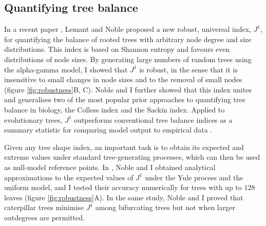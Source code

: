 \subsection{Quantifying tree balance}
In a recent paper \cite{lemant_robust_2022}, Lemant and Noble proposed a new
robust, universal index, $J^1$, for quantifying the balance of rooted trees
with arbitrary node degree and size distributions. This index is based on
Shannon entropy and favours even distributions of node sizes. By generating
large numbers of random trees using the alpha-gamma model, I showed that $J^1$
is robust, in the sense that it is insensitive to small changes in node sizes
and to the removal of small nodes (figure \ref{fig:robustness}B, C). Noble and
I further showed that this index unites and generalises two of the most popular
prior approaches to quantifying tree balance in biology, the Colless index and
the Sackin index. Applied to evolutionary trees, $J^1$ outperforms conventional
tree balance indices as a summary statistic for comparing model output to
empirical data \cite{noble_spatial_2022}.\par Given any tree shape index, an
important task is to obtain its expected and extreme values under standard
tree-generating processes, which can then be used as null-model reference
points. In \cite{lemant_robust_2022}, Noble and I obtained analytical
approximations to the expected values of $J^1$ under the Yule process and the
uniform model, and I tested their accuracy numerically for trees with up to
$128$ leaves (figure \ref{fig:robustness}A). In the same study, Noble and I
proved that caterpillar trees minimise $J^1$ among bifurcating trees but not
when larger outdegrees are permitted.\par

